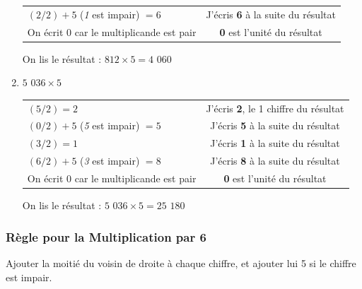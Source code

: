 \documentclass[a4paper]{article}
\begin{document}
\begin{small}
\begin{enumerate}
\begin{tabular}{l|c}
		\tabularnewline
		
		$(2 / 2) + 5$ (\textit{1} est impair) $= 6$ & J'écris \textbf{6} à la suite du résultat
		
		\tabularnewline
		
		On écrit 0 car le multiplicande est pair & \textbf{0} est l'unité du résultat
		
	\end{tabular}
	
	On lis le résultat : {\boldmath $812 \times 5 = 4$ $060$}\\
	


	
		
	\item $5$ $036 \times 5$
	
	\begin{tabular}{l|c}

		$(5 / 2) = 2$ & J'écris \textbf{2}, le 1\up{er} chiffre du résultat
		
		\tabularnewline
		
		$(0 / 2) + 5$ (\textit{5} est impair) $= 5$ & J'écris \textbf{5} à la suite du résultat
		
		\tabularnewline
		
		$(3 / 2) = 1$ & J'écris \textbf{1} à la suite du résultat
		
		\tabularnewline
		
		$(6 / 2) + 5$ (\textit{3} est impair) $= 8$ & J'écris \textbf{8} à la suite du résultat
		
		\tabularnewline
		
		On écrit 0 car le multiplicande est pair & \textbf{0} est l'unité du résultat
		
	\end{tabular}
	
	On lis le résultat : {\boldmath $5$ $036 \times 5 = 25$ $180$}\\
	

\end{enumerate}
\end{small}


\vfill
{\noindent \dotfill}


\subsubsection*{Règle pour la Multiplication par 6}

Ajouter la moitié du voisin de droite à chaque chiffre, et ajouter lui 5 si le chiffre est impair.\\
\end{document}

